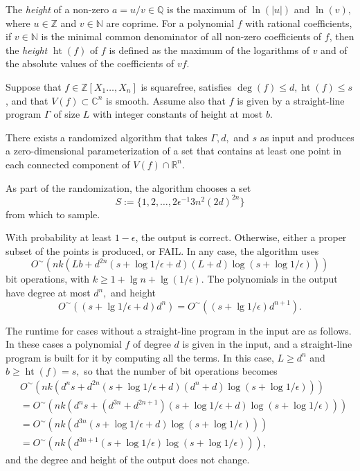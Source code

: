 \documentclass[sigconf]{acmart}
\DeclareMathOperator{\htt}{ht}
\def\C{\mathbb{C}}
\def\Q{\mathbb{Q}}
\def\R{\mathbb{R}}
\newcommand{\ZZ}{{\mathbb{Z}}}
\begin{document}
The {\em height} of a non-zero $a=u/v \in \Q$ is the maximum of
$\ln(|u|)$ and $\ln(v),$ where $u \in \mathbb{Z}$ and $v \in
\mathbb{N}$ are coprime. For a polynomial $f$ with rational
coefficients, if $v \in \mathbb N$ is the minimal common denominator
of all non-zero coefficients of $f$, then the \textit{height}
$\htt(f)$ of $f$ is defined as the maximum of the logarithms of $v$
and of the absolute values of the coefficients of $vf$.

\begin{theorem}\label{theo:main}
  Suppose that $f\in\ZZ[X_1\hdots,X_n]$ is squarefree, satisfies
  $\deg(f) \leq d, \htt(f) \leq s$, and that $V(f) \subset \C^n$ is
  smooth.  Assume also that $f$ is given by a straight-line program
  $\Gamma$ of size $L$ with integer constants of height at most $b.$

  There exists a randomized algorithm that takes $\Gamma, d,$ and $s$
  as input and produces a zero-dimensional parameterization of a set
  that contains at least one point in each connected component of
  $V(f) \cap \R^n$. 
  
  As part of the randomization, the algorithm chooses a set 
  \[
  S := \{1,2,\hdots,2\epsilon^{-1}3n^2(2d)^{2n}\}
  \]
  from which to sample. 
  
  With probability at least $1-\epsilon$, the output is correct. Otherwise, either a proper subset of the points is produced, or FAIL.  In any case, the algorithm uses
  \[
  O^{\sim}(nk(Lb+d^{2n}(s + \log 1/\epsilon+d)(L+d)\log(s + \log 1/\epsilon)))
  \]
  bit operations, with $k \geq 1 + \lg n + \lg(1/\epsilon)$. The polynomials in
  the output have degree at most $d^n,$ and height 
  \[
  O^{\sim}((s+\lg 1/\epsilon + d)d^n)
  =O^{\sim}((s+\lg 1/\epsilon)d^{n+1}).
  \]
\end{theorem}

The runtime for cases without a straight-line program in the input are as follows. In these cases a polynomial $f$ of degree $d$ is given in the input, and a straight-line program is built for it by computing all the terms. In this case, $L \geq d^n$ and $b \geq \htt(f) = s,$ so that the number of bit operations becomes
\begin{align*}
&O^{\sim}(nk(d^ns+d^{2n}(s + \log 1/\epsilon+d)(d^n+d)\log(s + \log 1/\epsilon)))\\
      &= 
O^{\sim}(nk(d^ns+(d^{3n}+d^{2n+1})(s + \log 1/\epsilon+d)\log(s + \log 1/\epsilon)))\\
     &= 
O^{\sim}(nk(d^{3n}(s + \log 1/\epsilon+d)\log(s + \log 1/\epsilon)))\\
     &= 
O^{\sim}(nk(d^{3n+1}(s + \log 1/\epsilon)\log(s + \log 1/\epsilon))),
\end{align*}
and the degree and height of the output does not change.
\end{document}
